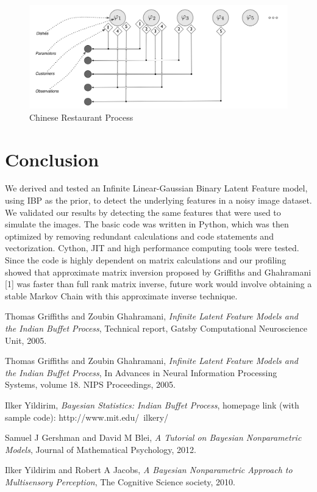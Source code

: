 \documentclass[11pt]{article}
\begin{document}
\begin{figure}
\includegraphics[width=\linewidth]{CRP.png}
\caption {Chinese Restaurant Process}
\label{fig:CRP}
\end{figure}

\newpage
\section{Conclusion}
We derived and tested an Infinite Linear-Gaussian Binary Latent Feature model, using IBP as the prior, to detect the underlying features in a noisy image dataset. We validated our results by detecting the same features that were used to simulate the images. The basic code was written in Python, which was then optimized by removing redundant calculations and code statements and vectorization. Cython, JIT and high performance computing tools were tested. Since the code is highly dependent on matrix calculations and our profiling showed that approximate matrix inversion proposed by Griffiths and Ghahramani [1] was faster than full rank matrix inverse, future work would involve obtaining a stable Markov Chain with this approximate inverse technique.

\begin{thebibliography}{9}

  Thomas Griffiths and Zoubin Ghahramani,
  \emph{Infinite Latent Feature Models and the Indian Buffet Process},
  Technical report, Gatsby Computational Neuroscience Unit, 
  2005.
  
  Thomas Griffiths and Zoubin Ghahramani,
  \emph{Infinite Latent Feature Models and the Indian Buffet Process},
  In Advances in Neural Information Processing Systems, volume 18. NIPS Proceedings,
  2005.
  
  Ilker Yildirim,
  \emph{Bayesian Statistics: Indian Buffet Process}, homepage link (with sample code): http://www.mit.edu/~ilkery/
  
  Samuel J Gershman and David M Blei,
  \emph{A Tutorial on Bayesian Nonparametric Models},
  Journal of Mathematical Psychology, 
  2012.
  
  Ilker Yildirim and Robert A Jacobs,
  \emph{A Bayesian Nonparametric Approach to Multisensory Perception},
  The Cognitive Science society, 
  2010.
  
\end{thebibliography}
\end{document}
